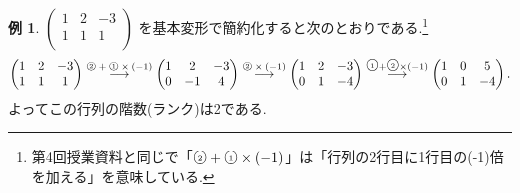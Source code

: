 \documentclass[dvipdfmx,a4paper,11pt]{article}
\newcommand{\maru}[1]{\raise0.2ex\hbox{\textcircled{\tiny{#1}}}}
\theoremstyle{definition}
\newtheorem{exa}[thm]{例}
\begin{document}
\begin{exa}
$
 \begin{pmatrix}
 1& 2& -3  \\
 1& 1& 1  \\
 \end{pmatrix}
 $
 を基本変形で簡約化すると次のとおりである.\footnote{第4回授業資料と同じで「$\maru{2} + \maru{1}\times(-1)$」は「行列の2行目に1行目の(-1)倍を加える」を意味している.}
 \begin{align*}
  \begin{pmatrix}
 1& 2& -3  \\
 1& 1& 1  \\
 \end{pmatrix}
 \overset{\text{$\maru{2} + \maru{1}\times(-1)$}}{\longrightarrow} 
   \begin{pmatrix}
 1& 2& -3  \\
 0& -1& 4  \\
 \end{pmatrix}
 \overset{\text{$\maru{2} \times(-1)$}}{\longrightarrow} 
   \begin{pmatrix}
 1& 2& -3  \\
 0& 1& -4  \\
 \end{pmatrix}
  \overset{\maru{1} + \maru{2}\times(-1)}{\longrightarrow} 
   \begin{pmatrix}
 1& 0& 5  \\
 0& 1& -4  \\
 \end{pmatrix}.
  \end{align*}
  よってこの行列の階数(ランク)は2である.
\end{exa}
\end{document}

